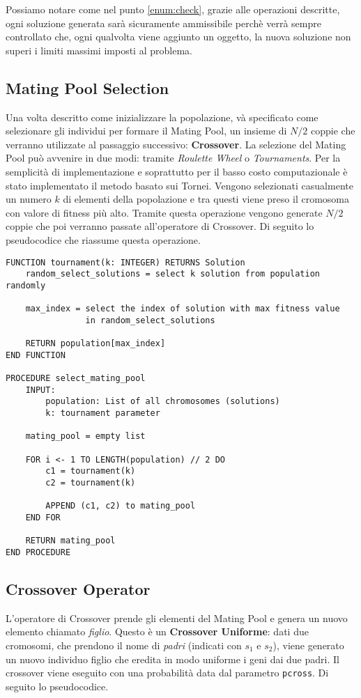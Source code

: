 Possiamo notare come nel punto \ref{enum:check}, grazie alle operazioni
descritte, ogni soluzione generata sarà sicuramente ammissibile perchè verrà
sempre controllato che, ogni qualvolta viene aggiunto un oggetto, la nuova
soluzione non superi i limiti massimi imposti al problema.

\subsection{Mating Pool Selection}
Una volta descritto come inizializzare la popolazione, và specificato come
selezionare gli individui per formare il Mating Pool, un insieme di $N/2$ coppie
che verranno utilizzate al passaggio successivo: \textbf{Crossover}. La
selezione del Mating Pool può avvenire in due modi: tramite \textit{Roulette
    Wheel} o \textit{Tournaments}. Per la semplicità di implementazione e
soprattutto per il basso costo computazionale è stato implementato il metodo
basato sui Tornei. Vengono selezionati casualmente un numero $k$ di elementi
della popolazione e tra questi viene preso il cromosoma con valore di fitness
più alto. Tramite questa operazione vengono generate $N/2$ coppie che poi verranno
passate all'operatore di Crossover.
Di seguito lo pseudocodice che riassume questa operazione.

\begin{lstlisting}[caption={Implementazione del metodo per la selezione del Mating Pool basata sui Tornei.}]
FUNCTION tournament(k: INTEGER) RETURNS Solution
    random_select_solutions = select k solution from population randomly

    max_index = select the index of solution with max fitness value
                in random_select_solutions

    RETURN population[max_index]
END FUNCTION

PROCEDURE select_mating_pool
    INPUT:
        population: List of all chromosomes (solutions)
        k: tournament parameter

    mating_pool = empty list

    FOR i <- 1 TO LENGTH(population) // 2 DO
        c1 = tournament(k)
        c2 = tournament(k)

        APPEND (c1, c2) to mating_pool
    END FOR

    RETURN mating_pool
END PROCEDURE
\end{lstlisting}

\subsection{Crossover Operator}
L'operatore di Crossover prende gli elementi del Mating Pool e genera un nuovo
elemento chiamato \textit{figlio}. Questo è un \textbf{Crossover Uniforme}: dati
due cromosomi, che prendono il nome di \textit{padri} (indicati con $s_1$ e
$s_2$), viene generato un nuovo individuo figlio che eredita in modo uniforme i
geni dai due padri. Il crossover viene eseguito con una probabilità data dal
parametro \verb|pcross|. Di seguito lo pseudocodice.

